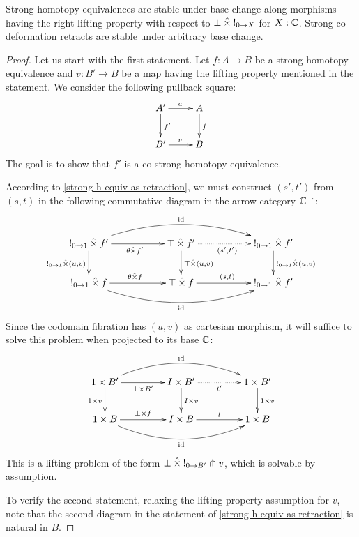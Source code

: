 \documentclass[reqno,10pt,a4paper,oneside]{amsart}
\begin{document}
\begin{lemma}
\label{strong-h-equiv-base-change-along-fibration}
Strong homotopy equivalences are stable under base change along morphisms having the right lifting property with respect to $\bot \mathbin{\hat{\times}} \mathord{!}_{0 \to X}$ for $X : \mathbb{C}$.
Strong co-deformation retracts are stable under arbitrary base change.
\end{lemma}

\begin{proof}
Let us start with the first statement.
Let $f : A \to B$ be a strong homotopy equivalence and $v : B' \to B$ be a map having the lifting property mentioned in the statement.
We consider the following pullback square:
\[
\xymatrix{
  A'
  \ar[r]^{u}
  \ar[d]^{f'}
&
  A
  \ar[d]^{f}
\\
  B'
  \ar[r]^{v}
&
  B
}
\]
The goal is to show that $f'$ is a co-strong homotopy equivalence.

According to \cref{strong-h-equiv-as-retraction}, we must construct $(s', t')$ from $(s, t)$ in the following commutative diagram in the arrow category $\mathbb{C}^{\to}$:
\[
\xymatrix@C+3em{
  \canonical_{0 \to 1} \hattimes f'
  \ar[r]_{\theta \hattimes f'}
  \ar[d]_{\canonical_{0 \to 1} \hattimes (u, v)}
  \ar@/^2em/[rr]^{\id}
&
  \top \hattimes f'
  \ar@{.>}[r]_{(s', t')}
  \ar[d]^{\top \hattimes (u, v)}
&
  \canonical_{0 \to 1} \hattimes f'
  \ar[d]^{\canonical_{0 \to 1} \hattimes (u, v)}
\\
  \canonical_{0 \to 1} \hattimes f
  \ar[r]^{\theta \hattimes f}
  \ar@/_2em/[rr]_{\id}
&
  \top \hattimes f
  \ar[r]^{(s, t)}
&
  \canonical_{0 \to 1} \hattimes f'
}
\]
Since the codomain fibration has $(u, v)$ as cartesian morphism, it will suffice to solve this problem when projected to its base $\mathbb{C}$:
\[
\xymatrix@C+2em{
  1 \times B'
  \ar[r]_{\bot \times B'}
  \ar[d]_{1 \times v}
  \ar@/^2em/[rr]^{\id}
&
  I \times B'
  \ar@{.>}[r]_{t'}
  \ar[d]^{I \times v}
&
  1 \times B'
  \ar[d]^{1 \times v}
\\
  1 \times B
  \ar[r]^{\bot \times f}
  \ar@/_2em/[rr]_{\id}
&
  I \times B
  \ar[r]^{t}
&
  1 \times B
}
\]
This is a lifting problem of the form $\bot \mathbin{\hat{\times}} \mathord{!}_{0 \to B'} \pitchfork v$, which is solvable by assumption.

To verify the second statement, relaxing the lifting property assumption for $v$, note that the second diagram in the statement of \cref{strong-h-equiv-as-retraction} is natural in $B$.
\end{proof}
\end{document}
